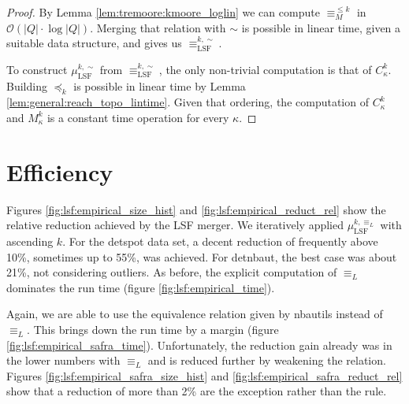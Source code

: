 \begin{proof}
	By Lemma \ref{lem:tremoore:kmoore_loglin} we can compute $\equiv_M^{\leq k}$ in $\mathcal{O}(|Q| \cdot \log |Q|)$. Merging that relation with $\sim$ is possible in linear time, given a suitable data structure, and gives us $\equiv_\text{LSF}^{k,\sim}$.
	
	To construct $\mu_\text{LSF}^{k,\sim}$ from $\equiv_\text{LSF}^{k,\sim}$, the only non-trivial computation is that of $C_\kappa^k$. Building $\preceq_k$ is possible in linear time by Lemma \ref{lem:general:reach_topo_lintime}. Given that ordering, the computation of $C_\kappa^k$ and $M_\kappa^k$ is a constant time operation for every $\kappa$.
\end{proof}


\section{Efficiency} %
Figures \ref{fig:lsf:empirical_size_hist} and \ref{fig:lsf:empirical_reduct_rel} show the relative reduction achieved by the LSF merger. We iteratively applied $\mu_\text{LSF}^{k,\equiv_L}$ with ascending $k$. For the \textsf{detspot} data set, a decent reduction of frequently above 10\%, sometimes up to 55\%, was achieved. For \textsf{detnbaut}, the best case was about 21\%, not considering outliers. As before, the explicit computation of $\equiv_L$ dominates the run time (figure \ref{fig:lsf:empirical_time}).

Again, we are able to use the equivalence relation given by nbautils instead of $\equiv_L$. This brings down the run time by a margin (figure \ref{fig:lsf:empirical_safra_time}). Unfortunately, the reduction gain already was in the lower numbers with $\equiv_L$ and is reduced further by weakening the relation. Figures \ref{fig:lsf:empirical_safra_size_hist} and \ref{fig:lsf:empirical_safra_reduct_rel} show that a reduction of more than 2\% are the exception rather than the rule.

